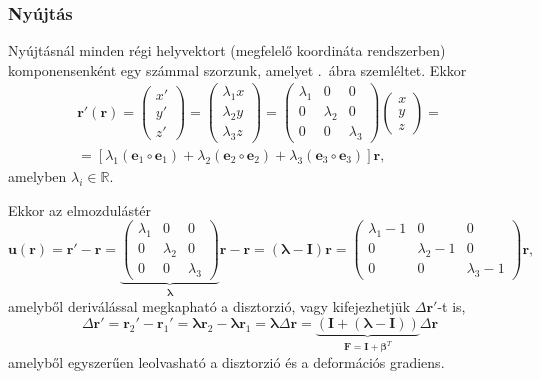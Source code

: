 \documentclass[12pt,a4paper]{scrartcl}
\let\mathbf\bm
\begin{document}
\subsubsection{Nyújtás}
Nyújtásnál minden régi helyvektort (megfelelő koordináta rendszerben) komponensenként egy számmal szorzunk, amelyet \az{\ref{fig:nyujtas}}.\ ábra szemléltet. Ekkor
\begin{multline*}
{\mathbf{r}}'\left( {\mathbf{r}} \right) = \left( {\begin{array}{*{20}{c}}
  {x'} \\ 
  {y'} \\ 
  {z'} 
\end{array}} \right) = \left( {\begin{array}{*{20}{c}}
  {{\lambda _1}x} \\ 
  {{\lambda _2}y} \\ 
  {{\lambda _3}z} 
\end{array}} \right) = \left( {\begin{array}{*{20}{c}}
  {{\lambda _1}}&0&0 \\ 
  0&{{\lambda _2}}&0 \\ 
  0&0&{{\lambda _3}} 
\end{array}} \right)\left( {\begin{array}{*{20}{c}}
  x \\ 
  y \\ 
  z 
\end{array}} \right) = \\ = \left[ {{\lambda _1}\left( {{{\mathbf{e}}_1} \circ {{\mathbf{e}}_1}} \right) + {\lambda _2}\left( {{{\mathbf{e}}_2} \circ {{\mathbf{e}}_2}} \right) + {\lambda _3}\left( {{{\mathbf{e}}_3} \circ {{\mathbf{e}}_3}} \right)} \right]{\mathbf{r}},
\end{multline*}
amelyben ${\lambda _i} \in \mathbb{R}$.

Ekkor az elmozdulástér
\[{\mathbf{u}}\left( {\mathbf{r}} \right) = {\mathbf{r}}' - {\mathbf{r}} = \underbrace {\left( {\begin{array}{*{20}{c}}
  {{\lambda _1}}&0&0 \\ 
  0&{{\lambda _2}}&0 \\ 
  0&0&{{\lambda _3}} 
\end{array}} \right)}_{\mathbf{\lambda }}{\mathbf{r}} - {\mathbf{r}} = \left( {{\mathbf{\lambda }} - {\mathbf{I}}} \right){\mathbf{r}} = \left( {\begin{array}{*{20}{c}}
  {{\lambda _1} - 1}&0&0 \\ 
  0&{{\lambda _2} - 1}&0 \\ 
  0&0&{{\lambda _3} - 1} 
\end{array}} \right){\mathbf{r}},\]
amelyből deriválással megkapható a disztorzió, vagy kifejezhetjük $\Delta {\mathbf{r}}'$-t is,
\[\Delta {\mathbf{r}}' = {{\mathbf{r}}_2}' - {{\mathbf{r}}_1}' = {\mathbf{\lambda }}{{\mathbf{r}}_2} - {\mathbf{\lambda }}{{\mathbf{r}}_1} = {\mathbf{\lambda }}\Delta {\mathbf{r}} = \underbrace {\left( {{\mathbf{I}} + \left( {{\mathbf{\lambda }} - {\mathbf{I}}} \right)} \right)}_{{\mathbf{F}} = {\mathbf{I}} + {{\mathbf{\beta }}^T}}\Delta {\mathbf{r}}\]
amelyből egyszerűen leolvasható a disztorzió és a deformációs gradiens. 
\end{document}
